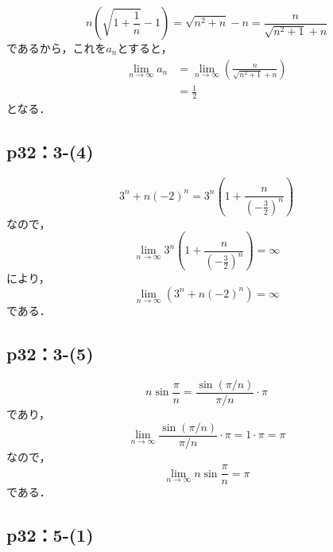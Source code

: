 \documentclass[uplatex,dvipdfmx,a4paper,10pt,fleqn]{jsarticle}
\begin{document}
\begin{tleftbar}
    \[
        n \left ( \sqrt{1+\frac{1}{n}}-1 \right) = \sqrt{n^2+n}-n = \frac{n}{\sqrt{n^2+1}+n}
    \]
    であるから，これを$a_n$とすると，
    \begin{align*}
        \lim_{n \to \infty} a_n & =\lim_{n \to \infty}  \left ( \frac{n}{\sqrt{n^2+1}+n} \right) \\
        & = \frac{1}{2}
    \end{align*}
    となる．
\end{tleftbar}

\subsection*{p32：3-(4)}

\begin{tleftbar}
\[
    3^n +n(-2)^n = 3^n \left (1+ \frac{n}{ \left (-\frac{3}{2} \right)^n } \right)
\]
なので，
\[
    \lim_{n \to \infty}  3^n \left (1+ \frac{n}{ \left (-\frac{3}{2} \right)^n } \right) =\infty
\]
により，
\[
    \lim_{n \to \infty} (3^n +n(-2)^n)=\infty 
\]
である．
\end{tleftbar}



\subsection*{p32：3-(5)}

\begin{tleftbar}
    \[
        n \sin \frac{\pi}{n} = \frac{\sin (\pi/n)}{\pi/n} \cdot \pi　
    \]
    であり，
    \[
        \lim_{n \to \infty} \frac{\sin (\pi/n)}{\pi/n} \cdot \pi　= 1 \cdot \pi =\pi
    \]
    なので，
    \[
        \lim_{n \to \infty} n \sin \frac{\pi}{n} = \pi
    \]
    である．
\end{tleftbar}




\subsection*{p32：5-(1)}
\end{document}
